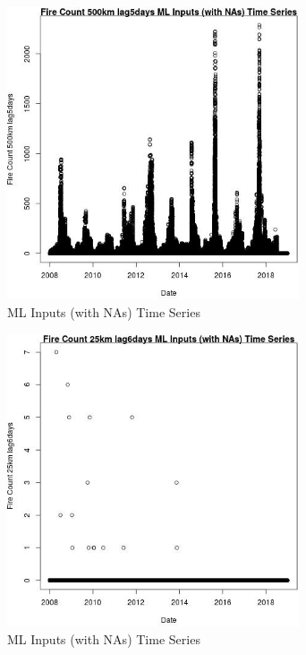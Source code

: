 \begin{figure} 
\centering  
\includegraphics[width=0.77\textwidth]{Code_Outputs/Report_ML_input_PM25_Step4_part_e_de_duplicated_aves_compiled_2019-05-21wNAs_Fire_Count_500km_lag5daysvDate.jpg} 
\caption{\label{fig:Report_ML_input_PM25_Step4_part_e_de_duplicated_aves_compiled_2019-05-21wNAsFire_Count_500km_lag5daysvDate}ML Inputs (with NAs) Time Series} 
\end{figure} 
 

\begin{figure} 
\centering  
\includegraphics[width=0.77\textwidth]{Code_Outputs/Report_ML_input_PM25_Step4_part_e_de_duplicated_aves_compiled_2019-05-21wNAs_Fire_Count_25km_lag6daysvDate.jpg} 
\caption{\label{fig:Report_ML_input_PM25_Step4_part_e_de_duplicated_aves_compiled_2019-05-21wNAsFire_Count_25km_lag6daysvDate}ML Inputs (with NAs) Time Series} 
\end{figure} 
 

